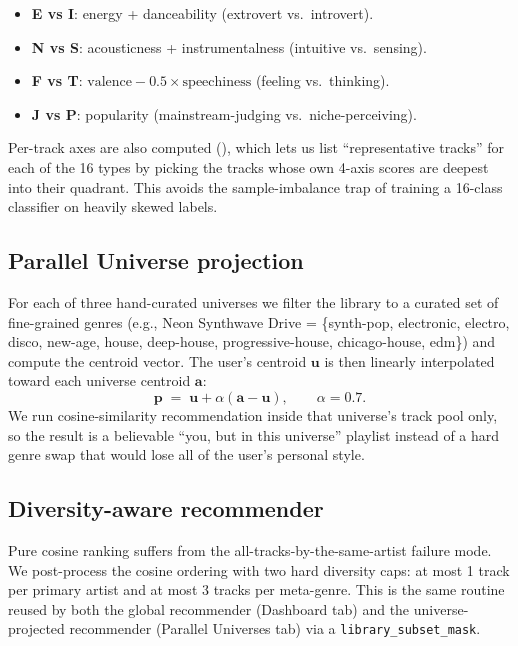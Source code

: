 \documentclass[11pt,a4paper]{article}
\begin{document}
\begin{itemize}
  \item \textbf{E vs I}: energy + danceability (extrovert vs.\
        introvert).
  \item \textbf{N vs S}: acousticness + instrumentalness (intuitive
        vs.\ sensing).
  \item \textbf{F vs T}: $\text{valence} - 0.5 \times
        \text{speechiness}$ (feeling vs.\ thinking).
  \item \textbf{J vs P}: popularity (mainstream-judging vs.\
        niche-perceiving).
\end{itemize}

Per-track axes are also computed
(), which lets us list
``representative tracks'' for each of the 16 types by picking the
tracks whose own 4-axis scores are deepest into their quadrant. This
avoids the sample-imbalance trap of training a 16-class classifier on
heavily skewed labels.

\subsection{Parallel Universe projection}

For each of three hand-curated universes we filter the library to a
curated set of fine-grained genres (e.g., Neon Synthwave Drive =
\{synth-pop, electronic, electro, disco, new-age, house, deep-house,
progressive-house, chicago-house, edm\}) and compute the centroid
vector. The user's centroid $\mathbf{u}$ is then linearly interpolated
toward each universe centroid $\mathbf{a}$:
\[
  \mathbf{p} \;=\; \mathbf{u} + \alpha (\mathbf{a} - \mathbf{u}),
  \qquad \alpha = 0.7.
\]
We run cosine-similarity recommendation inside that universe's track
pool only, so the result is a believable ``you, but in this universe''
playlist instead of a hard genre swap that would lose all of the
user's personal style.

\subsection{Diversity-aware recommender}

Pure cosine ranking suffers from the all-tracks-by-the-same-artist
failure mode. We post-process the cosine ordering with two hard
diversity caps: at most 1 track per primary artist and at most 3
tracks per meta-genre. This is the same routine reused by both the
global recommender (Dashboard tab) and the universe-projected
recommender (Parallel Universes tab) via a
\texttt{library\_subset\_mask}.
\end{document}

